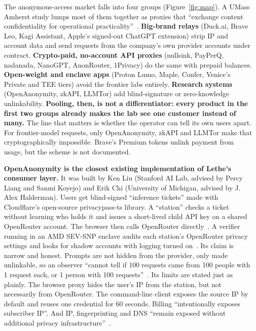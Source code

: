 \documentclass[10pt,a4paper]{article}
\begin{document}
The anonymous-access market falls into four groups (Figure~\ref{fig:map}). A UMass Amherst study lumps most of them together as proxies that ``exchange content confidentiality for operational practicality''~\cite{arxiv-2609-33903-umass}. \textbf{Big-brand relays} (Duck.ai, Brave Leo, Kagi Assistant, Apple's signed-out ChatGPT extension) strip IP and account data and send requests from the company's own provider accounts under contract. \textbf{Crypto-paid, no-account API proxies} (nullsink, PayPerQ, nadanada, NanoGPT, AnonRouter, 1Privacy) do the same with prepaid balances. \textbf{Open-weight and enclave apps} (Proton Lumo, Maple, Confer, Venice's Private and TEE tiers) avoid the frontier labs entirely. \textbf{Research systems} (OpenAnonymity, zkAPI, LLMTor) add blind-signature or zero-knowledge unlinkability. \textbf{Pooling, then, is not a differentiator: every product in the first two groups already makes the lab see one customer instead of many.} The line that matters is whether the operator can tell its own users apart. For frontier-model requests, only OpenAnonymity, zkAPI and LLMTor make that cryptographically impossible. Brave's Premium tokens unlink payment from usage, but the scheme is not documented.

\textbf{OpenAnonymity is the closest existing implementation of Lethe's consumer layer.} It was built by Ken Liu (Stanford AI Lab, advised by Percy Liang and Sanmi Koyejo) and Erik Chi (University of Michigan, advised by J. Alex Halderman). Users get blind-signed ``inference tickets'' made with Cloudflare's open-source privacypass-ts library. A ``station'' checks a ticket without learning who holds it and issues a short-lived child API key on a shared OpenRouter account. The browser then calls OpenRouter directly~\cite{openanonymity-oa-station-r,openanonymity-oa-chat-priv}. A verifier running in an AMD SEV-SNP enclave audits each station's OpenRouter privacy settings and looks for shadow accounts with logging turned on~\cite{openanonymity-oa-verifier}. Its claim is narrow and honest. Prompts are not hidden from the provider, only made unlinkable, so an observer ``cannot tell if 100 requests came from 100 people with 1 request each, or 1 person with 100 requests''~\cite{openanonymity-oa-chat-gith}. Its limits are stated just as plainly. The browser proxy hides the user's IP from the station, but not necessarily from OpenRouter. The command-line client exposes the source IP by default and reuses one credential for 60 seconds. Billing ``intentionally exposes subscriber IP''. And IP, fingerprinting and DNS ``remain exposed without additional privacy infrastructure''~\cite{openanonymity-oa-chat-priv}.
\end{document}
